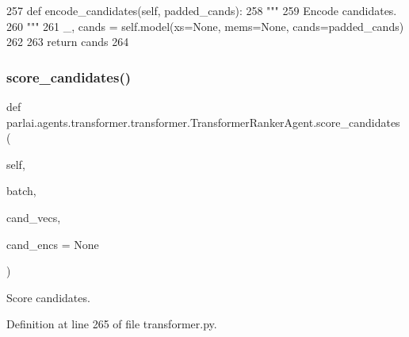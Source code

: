 \begin{DoxyCode}
257     \textcolor{keyword}{def }encode\_candidates(self, padded\_cands):
258         \textcolor{stringliteral}{"""}
259 \textcolor{stringliteral}{        Encode candidates.}
260 \textcolor{stringliteral}{        """}
261         \_, cands = self.model(xs=\textcolor{keywordtype}{None}, mems=\textcolor{keywordtype}{None}, cands=padded\_cands)
262 
263         \textcolor{keywordflow}{return} cands
264 
\end{DoxyCode}
\mbox{\label{classparlai_1_1agents_1_1transformer_1_1transformer_1_1TransformerRankerAgent_af1af764f534c04a7bc98f11b3fe8f6ca}} 
\subsubsection{\texorpdfstring{score\+\_\+candidates()}{score\_candidates()}}
{\footnotesize\ttfamily def parlai.\+agents.\+transformer.\+transformer.\+Transformer\+Ranker\+Agent.\+score\+\_\+candidates (\begin{DoxyParamCaption}\item[{}]{self,  }\item[{}]{batch,  }\item[{}]{cand\+\_\+vecs,  }\item[{}]{cand\+\_\+encs = {\ttfamily None} }\end{DoxyParamCaption})}

\begin{DoxyVerb}Score candidates.
\end{DoxyVerb}
 

Definition at line 265 of file transformer.\+py.


